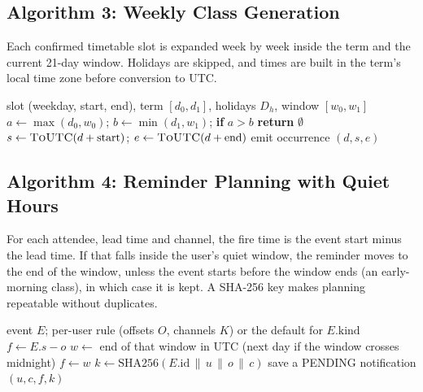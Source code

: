 \subsection{Algorithm 3: Weekly Class Generation}
Each confirmed timetable slot is expanded week by week inside the term and the current 21-day window. Holidays are skipped, and times are built in the term's local time zone before conversion to UTC.
\begin{algorithm}[H]
\caption{Class generation for one slot (application/calendar/recurrence.py)}
\begin{algorithmic}[1]
\Require slot (weekday, start, end), term $[d_0, d_1]$, holidays $D_h$, window $[w_0, w_1]$
\State $a \gets \max(d_0, w_0)$; $b \gets \min(d_1, w_1)$; \textbf{if} $a > b$ \textbf{return} $\emptyset$
    \State $s \gets \textsc{ToUTC}(d + \text{start})$; $e \gets \textsc{ToUTC}(d + \text{end})$ 
    \State emit occurrence $(d, s, e)$
  \EndIf
\EndFor
\end{algorithmic}
\end{algorithm}

\subsection{Algorithm 4: Reminder Planning with Quiet Hours}
For each attendee, lead time and channel, the fire time is the event start minus the lead time. If that falls inside the user's quiet window, the reminder moves to the end of the window, unless the event starts before the window ends (an early-morning class), in which case it is kept. A SHA-256 key makes planning repeatable without duplicates.
\begin{algorithm}[H]
\caption{Reminder planning (application/reminders/planner.py, maths.py)}
\begin{algorithmic}[1]
\Require event $E$; per-user rule (offsets $O$, channels $K$) or the default for $E.\text{kind}$
  \State $f \gets E.s - o$
  \If{local time of $f$ lies in $u$'s quiet window $[q_s, q_e)$}
    \State $w \gets$ end of that window in UTC (next day if the window crosses midnight)
     $f \gets w$ \EndIf
  \EndIf
  \State $k \gets \mathrm{SHA256}(E.\text{id} \,\|\, u \,\|\, o \,\|\, c)$
   save a PENDING notification $(u, c, f, k)$ \EndIf
\EndFor
\end{algorithmic}
\end{algorithm}

